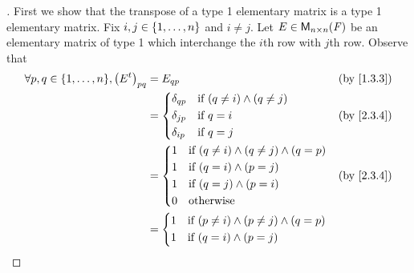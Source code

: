\begin{proof}[]
	First we show that the transpose of a type 1 elementary matrix is a type 1 elementary matrix.
	Fix \(i, j \in \left\lbrace1, \dots, n\right\rbrace\) and \(i \neq j\).
	Let \(E \in \mathsf{M}_{{n} \times n}({\mathit{F}})\) be an elementary matrix of type 1 which interchange the \(i\)th row with \(j\)th row.
	Observe that
	\begin{align*}
		\forall p, q \in \set{1, \dots, n}, \pa{\tp{E}}_{p q} & = E_{q p}                                                   &  & \by{1.3.3} \\
		                                                      & = \begin{dcases}
			                                                          \delta_{q p} & \text{if } (q \neq i) \land (q \neq j) \\
			                                                          \delta_{j p} & \text{if } q = i                       \\
			                                                          \delta_{i p} & \text{if } q = j
		                                                          \end{dcases}    &  & \by{2.3.4}                     \\
		                                                      & = \begin{dcases}
			                                                          1 & \text{if } (q \neq i) \land (q \neq j) \land (q = p) \\
			                                                          1 & \text{if } (q = i) \land (p = j)                     \\
			                                                          1 & \text{if } (q = j) \land (p = i)                     \\
			                                                          0 & \text{otherwise}
		                                                          \end{dcases} &  & \by{2.3.4}                  \\
		                                                      & = \begin{dcases}
			                                                          1 & \text{if } (p \neq i) \land (p \neq j) \land (q = p) \\
			                                                          1 & \text{if } (q = i) \land (p = j)                     \\

\end{dcases}
\end{align*}
\end{proof}
